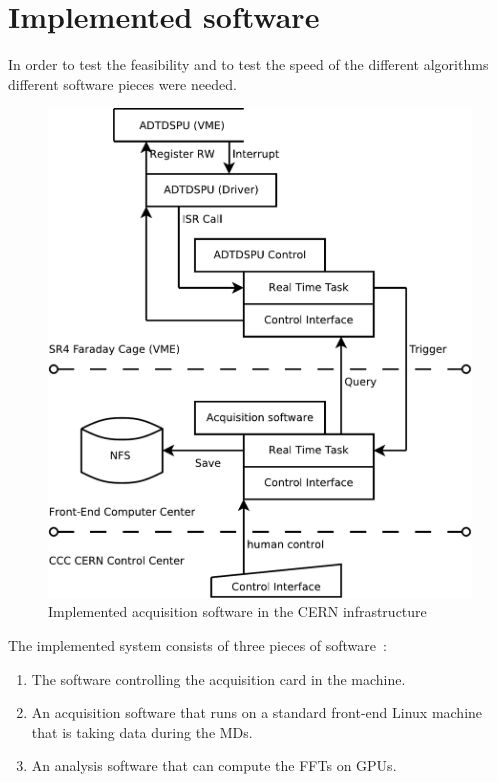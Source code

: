 \chapter{Implemented software}

In order to test the feasibility and to test the speed of the different algorithms different software pieces were needed.

\begin{figure}[H]
\caption{Implemented acquisition software in the CERN infrastructure}
\centering
\includegraphics[scale=0.4]{ImplementedSoftFesa.pdf}
\end{figure}

The implemented system consists of three pieces of software~:
\begin{enumerate}
\item The software controlling the acquisition card in the machine.
\item An acquisition software that runs on a standard front-end Linux machine that is taking data during the \glspl{MD}.
\item An analysis software that can compute the \glspl{FFT} on \glspl{GPU}.
\end{enumerate}

